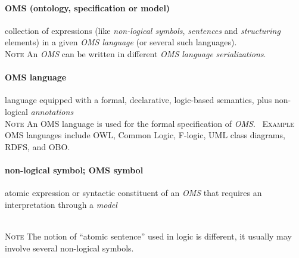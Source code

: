 \documentclass[10pt,%
\ifpretendfinal
final%
\else
draft%
\fi,
]{scrreprt}
\newcommand*{\termref}[1]{\textit{#1}}
\newcommand*{\synonym}{; }
\newcommand{\termdefinition}[2]{\paragraph{#1} #2}
\newenvironment{definitions}[0]{\medskip }{}
\newenvironment{note}[0]{\ \\ \textsc{Note} \quad}{}
\newenvironment{example}[0]{\ \newline \textsc{Example}\quad }{}
\begin{document}
\begin{definitions}

\termdefinition{OMS (ontology, specification or model)}
{collection of expressions (like \termref{non-logical symbols}, \termref{sentences} and \termref{structuring} elements) in a given \termref{OMS language} (or several such languages).}
\begin{note}
	An \termref{OMS} can be written in different \termref{OMS language} \termref{serializations}.
\end{note}	

  \termdefinition{OMS language}{language equipped with a formal, declarative, logic-based semantics, plus non-logical \termref{annotations}}
  \begin{note}
  An OMS language is used for the formal specification of \termref{OMS}.
  \end{note}
  \begin{example}
    OMS languages include OWL, Common Logic, F-logic, UML class diagrams, RDFS, and OBO.
  \end{example}


  \termdefinition{non-logical symbol\synonym OMS symbol}{atomic expression or syntactic constituent of an \termref{OMS} that requires an interpretation through a \termref{model}}

  \begin{note}
  The notion of ``atomic sentence'' used in logic is different, it usually
  may involve several non-logical symbols.
  \end{note}


\end{definitions}
\end{document}
